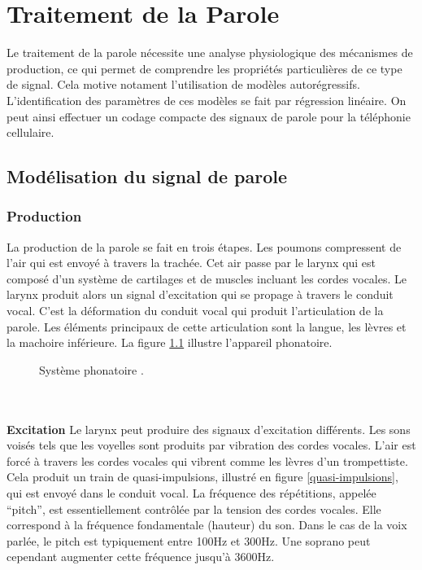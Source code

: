 \chapter{Traitement de la Parole}
\label{parole-chap}

Le traitement de la parole n\'ecessite une analyse
physiologique des m\'ecanismes
de production, ce qui permet de comprendre les propri\'et\'es
particuli\`eres de ce type de signal.
Cela motive notament l'utilisation de mod\`eles autor\'egressifs.
L'identification des param\`etres de ces mod\`eles se fait
par r\'egression lin\'eaire. On peut ainsi
effectuer un codage compacte des signaux de parole pour
la t\'el\'ephonie cellulaire.


\section{Mod\'elisation du signal de parole}
\label{modelisation-paro}

\subsection{Production}


La production de la parole se fait en trois \'etapes.
Les poumons compressent de l'air qui est envoy\'e
\`a travers la trach\'ee. Cet air passe par le larynx qui est
compos\'e d'un syst\`eme de cartilages et de muscles incluant les
cordes vocales. Le larynx produit alors un signal d'excitation qui
se propage \`a travers le conduit vocal. C'est la
d\'eformation du conduit vocal qui produit l'articulation de la
parole. Les \'el\'ements principaux de cette articulation sont la
langue, les l\`evres et la machoire inf\'erieure. La figure
\ref{parole-physio} illustre l'appareil phonatoire.
\begin{figure}
\vspace{7cm}
\caption{Syst\`eme phonatoire \protect \cite{karar}.}
\label{parole-physio}
\end{figure}
\\
\\
{\bf Excitation}
Le larynx peut produire des signaux d'excitation diff\'erents.
Les sons vois\'es tels que les voyelles sont produits par
vibration des cordes vocales. L'air est forc\'e \` a travers les
cordes vocales qui vibrent comme les l\`evres d'un trompettiste. Cela
produit un train de quasi-impulsions, illustr\'e en
figure \ref{quasi-impulsions},
qui est envoy\'e dans le conduit vocal.
La fr\'equence des r\'ep\'etitions, appel\'ee
``pitch'', est essentiellement contr\^ol\'ee par la tension des cordes
vocales. Elle correspond \`a la fr\'equence fondamentale (hauteur) du son.
Dans le cas de la voix parl\'ee, le pitch est typiquement
entre 100Hz et 300Hz. Une soprano peut cependant augmenter cette
fr\'equence jusqu'\`a 3600Hz.


